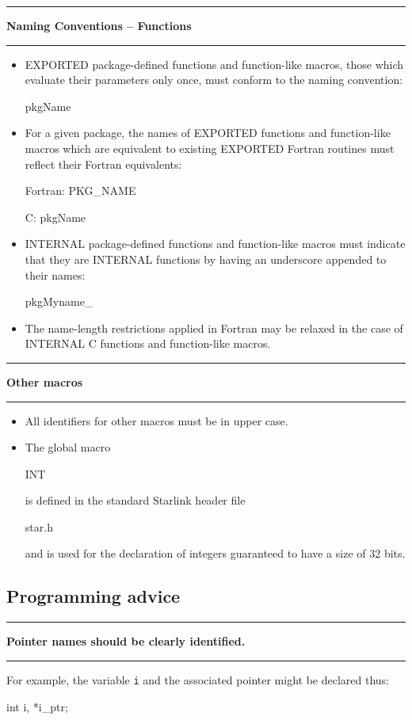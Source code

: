 \documentclass[twoside,11pt,nolof,noabs]{starlink}
\newcounter{sruleno}
\newcommand{\srule}[1]{
    \addtocounter{sruleno}{1}
    \goodbreak
    \rule{\textwidth}{0.3mm}
    \textbf{#1} \scpushright{\textbf{\thesruleno}}
    \rule{\textwidth}{0.1mm}
}
\begin{document}
\srule{Naming Conventions -- Functions}
\begin{itemize}
\item EXPORTED package-defined functions and function-like macros, those which
evaluate their parameters only once, must conform to the naming convention:
\begin{terminalv}
      pkgName
\end{terminalv}
\item For a given package, the names of EXPORTED functions
and function-like macros which are
equivalent to existing EXPORTED Fortran routines must reflect their
Fortran equivalents:
\begin{terminalv}
      Fortran:  PKG_NAME

      C:        pkgName
\end{terminalv}
\item INTERNAL package-defined functions and function-like macros
must indicate that they are INTERNAL
functions by having an underscore appended to their names:
\begin{terminalv}
      pkgMyname_
\end{terminalv}
\item The name-length restrictions applied in Fortran may be relaxed in the
case of INTERNAL C functions and function-like macros.
\end{itemize}

\srule{Other macros}
\begin{itemize}
\item All identifiers for other macros must be in upper case.
\item The global macro
\begin{terminalv}
      INT
\end{terminalv}
is defined in the standard Starlink header file
\begin{terminalv}
      star.h
\end{terminalv}
and is used for the declaration of integers guaranteed to have a size of
32 bits.
\end{itemize}

\subsection{Programming advice}

\srule{Pointer names should be clearly identified.}
For example, the variable \texttt{i} and the associated pointer
might be declared thus:
\begin{terminalv}
      int i, *i_ptr;
\end{terminalv}
\end{document}
